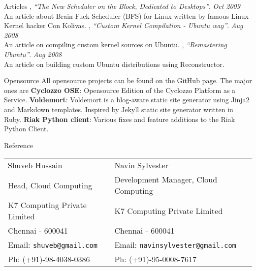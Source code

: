 \documentclass{resume}
\begin{document}
\newpage


\begin{category}{Articles}
  , {\em ``The New Scheduler on the Block, Dedicated to Desktops''}. \hfill {\em Oct 2009}\\
  An article about Brain Fuck Scheduler (BFS) for Linux written by famous Linux Kernel hacker Con Kolivas.
  , {\em ``Custom Kernel Compilation - Ubuntu way''}. \hfill {\em Aug 2008}\\
  An article on compiling custom kernel sources on Ubuntu.
  , {\em ``Remastering Ubuntu''}. \hfill {\em Aug 2008}\\
  An article on building custom Ubuntu distributions using Reconstructor.
\end{category}


\begin{category}{Opensource}
  \citemnobullet All opensource projects can be found on the GitHub page. The major ones are
  \citembullet \textbf{Cyclozzo OSE}: Opensource Edition of the Cyclozzo Platform as a Service.
  \citembullet \textbf{Voldemort}: Voldemort is a blog-aware static site generator using Jinja2 
  and Markdown templates. Inspired by Jekyll static site generator written in Ruby.
  \citembullet \textbf{Riak Python client}: Various fixes and feature additions to the Riak Python Client.
\end{category}


\begin{category}{Reference}
  \citemnobullet \\
  \begin{tabular}{ll}Shuveb Hussain&Navin Sylvester\\
    Head, Cloud Computing&Development Manager, Cloud Computing\\
    K7 Computing Private Limited&K7 Computing Private Limited\\
    Chennai - 600041&Chennai - 600041\\
    Email: \mbox{\small\tt shuveb@gmail.com}&Email: \mbox{\small\tt navinsylvester@gmail.com}\\
    Ph: (+91)-98-4038-0386&Ph: (+91)-95-0008-7617
  \end{tabular}
\end{category}
\end{document}
